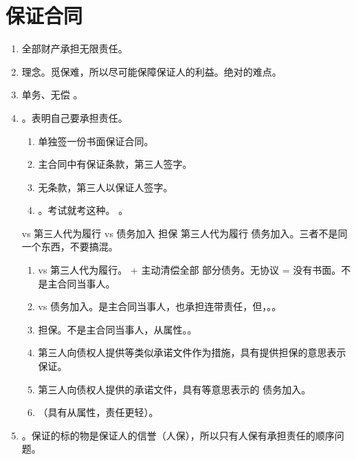 \section{保证合同}
\begin{enumerate}
  \item 全部财产承担无限责任。
  \item 理念。觅保难，所以尽可能保障保证人的利益。绝对的难点。
  \item 单务、无偿 \yjt {}。
  \item {}。表明自己要承担责任。
        \begin{enumerate}
          \item 单独签一份书面保证合同。
          \item 主合同中有保证条款，第三人签字。
          \item 无条款，第三人以保证人签字。
          \item {}。考试就考这种。
                。
        \end{enumerate}
        \begin{kk}{vs 第三人代为履行 vs 债务加入}
          担保 \bdy 第三人代为履行 \bdy 债务加入。三者不是同一个东西，不要搞混。
          \begin{enumerate}
            \item vs 第三人代为履行。 + 主动清偿全部 \hz 部分债务。无协议 = 没有书面。不是主合同当事人。
            \item vs 债务加入。是主合同当事人，也承担连带责任，但，。。
            \item 担保。不是主合同当事人，从属性。。
            \item 第三人向债权人提供等类似承诺文件作为措施，具有提供担保的意思表示 \yjt 保证。
            \item 第三人向债权人提供的承诺文件，具有等意思表示的 \yjt 债务加入。
            \item {}（具有从属性，责任更轻）。
          \end{enumerate}
        \end{kk}
  \item {}。保证的标的物是保证人的信誉（人保），所以只有人保有承担责任的顺序问题。

\end{enumerate}
